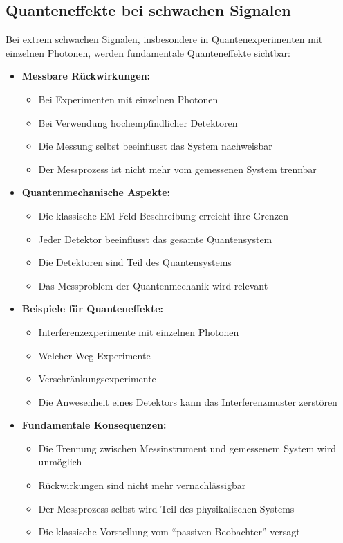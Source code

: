 \documentclass[12pt,a4paper]{article}
\begin{document}
	\subsection{Quanteneffekte bei schwachen Signalen}
	
	Bei extrem schwachen Signalen, insbesondere in Quantenexperimenten mit einzelnen Photonen, werden fundamentale Quanteneffekte sichtbar:
	
	\begin{itemize}
		\item \textbf{Messbare Rückwirkungen:}
		\begin{itemize}
			\item Bei Experimenten mit einzelnen Photonen
			\item Bei Verwendung hochempfindlicher Detektoren
			\item Die Messung selbst beeinflusst das System nachweisbar
			\item Der Messprozess ist nicht mehr vom gemessenen System trennbar
		\end{itemize}
		
		\item \textbf{Quantenmechanische Aspekte:}
		\begin{itemize}
			\item Die klassische EM-Feld-Beschreibung erreicht ihre Grenzen
			\item Jeder Detektor beeinflusst das gesamte Quantensystem
			\item Die Detektoren sind Teil des Quantensystems
			\item Das Messproblem der Quantenmechanik wird relevant
		\end{itemize}
		
		\item \textbf{Beispiele für Quanteneffekte:}
		\begin{itemize}
			\item Interferenzexperimente mit einzelnen Photonen
			\item Welcher-Weg-Experimente
			\item Verschränkungsexperimente
			\item Die Anwesenheit eines Detektors kann das Interferenzmuster zerstören
		\end{itemize}
		
		\item \textbf{Fundamentale Konsequenzen:}
		\begin{itemize}
			\item Die Trennung zwischen Messinstrument und gemessenem System wird unmöglich
			\item Rückwirkungen sind nicht mehr vernachlässigbar
			\item Der Messprozess selbst wird Teil des physikalischen Systems
			\item Die klassische Vorstellung vom ``passiven Beobachter'' versagt
		\end{itemize}
	\end{itemize}
	
\end{document}
